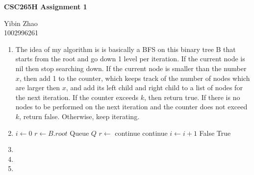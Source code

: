 \documentclass[10pt]{article}
\begin{document}
\begin{center}
{\bf \Large \bf CSC265H Assignment 1}\\
\end{center}

\noindent
Yibin Zhao\\
1002996261\\


\begin{enumerate}

\item %
	The idea of my algorithm is is basically a BFS on this binary tree B that starts from the root and go down 1 level per iteration. If the current node is nil then stop searching down. If the current node is smaller than the number $x$, then add 1 to the counter, which keeps track of the number of nodes which are larger then $x$, and add its left child and right child to a list of nodes for the next iteration. If the counter exceeds $k$, then return true. If there is no nodes to be performed on the next iteration and the counter does not exceed $k$, return false. Otherwise, keep iterating.

\item %
\begin{algorithm}
	\begin{algorithmic}[1]
		\State $i \gets 0$
		\State $r \gets B.root$
		\State Queue $Q$
		\State {}
			\State $r \gets$ 
				\State continue
			\Else	{}
				\State continue
			\Else
				\State {}
				\State {}
				\State $i \gets i+1$
				\EndIf
			\EndIf
		\EndWhile
			\State \Return False
		\Else
			\State \Return True
		\EndIf
	\EndFunction
	\end{algorithmic}
\end{algorithm}

\item %

\item %

\item %

\end{enumerate}
\end{document}

